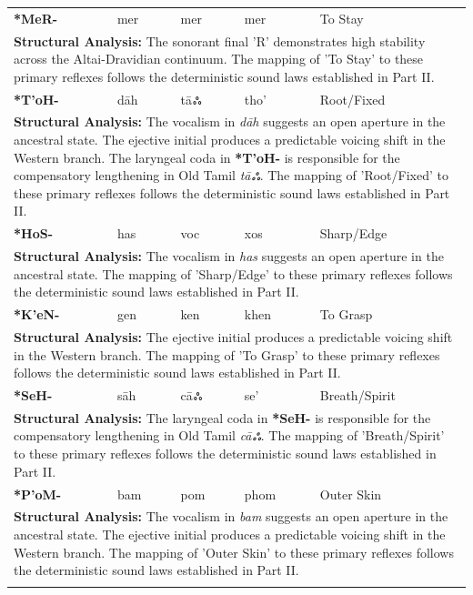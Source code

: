 \begin{longtable}{p{} p{} p{} p{} p{}}
\textbf{*MeR-} & mer & mer & mer & To Stay \\ 
\multicolumn{5}{p{\textwidth}}{\small \textbf{Structural Analysis:} The sonorant final 'R' demonstrates high stability across the Altai-Dravidian continuum. The mapping of 'To Stay' to these primary reflexes follows the deterministic sound laws established in Part II.} \\ \addlinespace[15pt] 
\textbf{*T'oH-} & dāh & tāஃ & tho' & Root/Fixed \\ 
\multicolumn{5}{p{\textwidth}}{\small \textbf{Structural Analysis:} The vocalism in \textit{dāh} suggests an open aperture in the ancestral state. The ejective initial produces a predictable voicing shift in the Western branch. The laryngeal coda in \textbf{*T'oH-} is responsible for the compensatory lengthening in Old Tamil \textit{tāஃ}. The mapping of 'Root/Fixed' to these primary reflexes follows the deterministic sound laws established in Part II.} \\ \addlinespace[15pt] 
\textbf{*HoS-} & has & voc & xos & Sharp/Edge \\ 
\multicolumn{5}{p{\textwidth}}{\small \textbf{Structural Analysis:} The vocalism in \textit{has} suggests an open aperture in the ancestral state. The mapping of 'Sharp/Edge' to these primary reflexes follows the deterministic sound laws established in Part II.} \\ \addlinespace[15pt] 
\textbf{*K'eN-} & gen & ken & khen & To Grasp \\ 
\multicolumn{5}{p{\textwidth}}{\small \textbf{Structural Analysis:} The ejective initial produces a predictable voicing shift in the Western branch. The mapping of 'To Grasp' to these primary reflexes follows the deterministic sound laws established in Part II.} \\ \addlinespace[15pt] 
\textbf{*SeH-} & sāh & cāஃ & se' & Breath/Spirit \\ 
\multicolumn{5}{p{\textwidth}}{\small \textbf{Structural Analysis:} The laryngeal coda in \textbf{*SeH-} is responsible for the compensatory lengthening in Old Tamil \textit{cāஃ}. The mapping of 'Breath/Spirit' to these primary reflexes follows the deterministic sound laws established in Part II.} \\ \addlinespace[15pt] 
\textbf{*P'oM-} & bam & pom & phom & Outer Skin \\ 
\multicolumn{5}{p{\textwidth}}{\small \textbf{Structural Analysis:} The vocalism in \textit{bam} suggests an open aperture in the ancestral state. The ejective initial produces a predictable voicing shift in the Western branch. The mapping of 'Outer Skin' to these primary reflexes follows the deterministic sound laws established in Part II.} \\ \addlinespace[15pt] 

\end{longtable}
